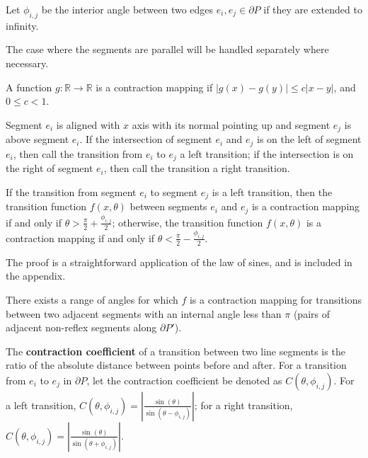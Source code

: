 \documentclass[]{styles/svproc}  %
\begin{document}
\begin{definition}
Let $\phi_{i,j}$ be the interior angle between two edges $e_i, e_j \in \partial P$ if
they are extended to infinity. 
\end{definition}

The case where the segments are parallel will be
handled separately where necessary. 

\begin{definition}

A function $g: \mathbb{R} \to \mathbb{R}$ is a contraction mapping if $\lvert g(x) - g(y)
\rvert \leq c \lvert x-y \rvert$, and $0 \leq c < 1$.
\end{definition}

\begin{definition}
Segment $e_i$ is aligned with $x$ axis with its normal pointing up and
segment $e_j$ is above segment $e_i$. If the intersection of segment $e_i$ and
$e_j$ is
on the left of segment $e_i$, then call the transition from $e_i$ to $e_j$ a left
transition; if the intersection is on the right of segment $e_i$, then call the
transition a right transition.
\end{definition}

\begin{lemma} \label{lemma:angrange}
If the transition from segment $e_i$ to segment $e_j$ is a left transition, then the
transition function $f(x, \theta)$ between segments $e_i$ and $e_j$ is a contraction
mapping if and only if $\theta > \frac{\pi}{2}+\frac{\phi_{i, j}}{2}$;
otherwise, the transition function $f(x, \theta)$ is a contraction mapping if
and only if $\theta < \frac{\pi}{2}-\frac{\phi_{i, j}}{2}$.
\end{lemma}

The proof is a straightforward application of the law of sines, and is included
in the appendix.

\begin{corollary} \label{coro:existcontract}
There exists a range of angles for which $f$ is a contraction mapping for transitions between two adjacent 
segments with an internal angle less than $\pi$ (pairs of adjacent non-reflex
segments along $\partial P'$).
\end{corollary}

\begin{definition}
The \textbf{contraction coefficient} of a transition between two
line segments is the ratio of the absolute distance between points before and after.
For a transition from $e_i$ to $e_j$ in $\partial P$, let the contraction
coefficient be denoted as $C(\theta, \phi_{i, j})$. 
For a left transition, $C(\theta, \phi_{i, j}) = | \frac{\sin(\theta)}{\sin(\theta - \phi_{i, j})} |$; 
for a right transition,  $C(\theta, \phi_{i, j}) = | \frac{\sin(\theta)}{\sin(\theta + \phi_{i, j})} |$.
\end{definition}
\end{document}
